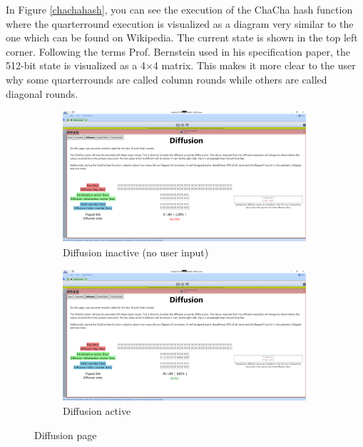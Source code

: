 \par

 In Figure \ref{chachahash}, you can see the execution of the ChaCha hash function where the quarterround execution is visualized as a diagram very similar to the one which can be found on Wikipedia. The current state is shown in the top left corner. Following the terms Prof. Bernstein used in his specification paper, the 512-bit state is visualized as a 4$\times$4 matrix. This makes it more clear to the user why some quarterrounds are called column rounds while others are called diagonal rounds.

\begin{figure}
\centering
\begin{subfigure}[t]{.5\textwidth}
  \centering
  \includegraphics[width=0.99\textwidth]{figures/diffusion-inactive}
  \caption{Diffusion inactive (no user input)}
  \label{diffusion.inactive}
\end{subfigure}%
\begin{subfigure}[t]{.5\textwidth}
  \centering
  \includegraphics[width=0.99\textwidth]{figures/diffusion-active}
  \caption{Diffusion active}
  \label{diffusion.active}
\end{subfigure}
\caption{Diffusion page}
\label{diffusion}
\end{figure}

